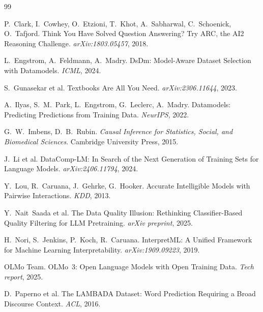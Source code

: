 \documentclass[twocolumn,letterpaper,10pt]{article}
\begin{document}
\small

\begin{thebibliography}{99}

P.~Clark, I.~Cowhey, O.~Etzioni, T.~Khot, A.~Sabharwal, C.~Schoenick,
O.~Tafjord.
\newblock Think You Have Solved Question Answering? Try ARC, the AI2
  Reasoning Challenge.
\newblock \emph{arXiv:1803.05457}, 2018.

L.~Engstrom, A.~Feldmann, A.~Madry.
\newblock DsDm: Model-Aware Dataset Selection with Datamodels.
\newblock \emph{ICML}, 2024.

S.~Gunasekar et al.
\newblock Textbooks Are All You Need.
\newblock \emph{arXiv:2306.11644}, 2023.

A.~Ilyas, S.~M.~Park, L.~Engstrom, G.~Leclerc, A.~Madry.
\newblock Datamodels: Predicting Predictions from Training Data.
\newblock \emph{NeurIPS}, 2022.

G.~W.~Imbens, D.~B.~Rubin.
\newblock \emph{Causal Inference for Statistics, Social, and Biomedical
  Sciences}.
\newblock Cambridge University Press, 2015.

J.~Li et al.
\newblock DataComp-LM: In Search of the Next Generation of Training
  Sets for Language Models.
\newblock \emph{arXiv:2406.11794}, 2024.

Y.~Lou, R.~Caruana, J.~Gehrke, G.~Hooker.
\newblock Accurate Intelligible Models with Pairwise Interactions.
\newblock \emph{KDD}, 2013.

Y.~Nait~Saada et al.
\newblock The Data Quality Illusion: Rethinking Classifier-Based
  Quality Filtering for LLM Pretraining.
\newblock \emph{arXiv preprint}, 2025.

H.~Nori, S.~Jenkins, P.~Koch, R.~Caruana.
\newblock InterpretML: A Unified Framework for Machine Learning
  Interpretability.
\newblock \emph{arXiv:1909.09223}, 2019.

OLMo Team.
\newblock OLMo~3: Open Language Models with Open Training Data.
\newblock \emph{Tech report}, 2025.

D.~Paperno et al.
\newblock The LAMBADA Dataset: Word Prediction Requiring a Broad
  Discourse Context.
\newblock \emph{ACL}, 2016.


\end{thebibliography}
\end{document}
